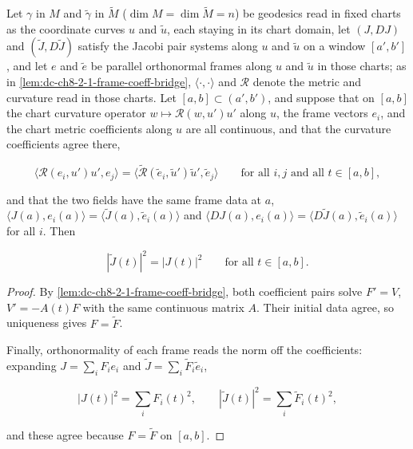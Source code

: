 \begin{lemma}
  \label{lem:dc-ch8-2-1-jacobi-norm-transfer-general}
  \leanok
  Let $\gamma$ in $M$ and $\tilde\gamma$ in $\tilde M$ ($\dim M=\dim\tilde M=n$) be geodesics
  read in fixed charts as the coordinate curves $u$ and $\tilde u$, each staying in its chart
  domain, let $(J,DJ)$ and $(\tilde J,D\tilde J)$ satisfy the Jacobi pair systems along $u$
  and $\tilde u$ on a window $[a',b']$, and let $e$ and $\tilde e$ be parallel orthonormal
  frames along $u$ and $\tilde u$ in those charts; as in
  \cref{lem:dc-ch8-2-1-frame-coeff-bridge}, $\langle\cdot,\cdot\rangle$ and $\mathcal R$
  denote the metric and curvature read in those charts. Let $[a,b]\subset(a',b')$, and
  suppose that on $[a,b]$ the chart curvature operator $w\mapsto\mathcal R(w,u')u'$ along
  $u$, the frame vectors $e_i$, and the chart metric coefficients along $u$ are all
  continuous, and that the curvature coefficients agree there,

  $$
  \langle\mathcal R(e_i,u')u',e_j\rangle
  =\big\langle\tilde{\mathcal R}(\tilde e_i,\tilde u')\tilde u',\tilde e_j\big\rangle
  \qquad\text{for all }i,j\text{ and all }t\in[a,b],
  $$

  and that the two fields have the same frame data at $a$,
  $\langle J(a),e_i(a)\rangle=\langle\tilde J(a),\tilde e_i(a)\rangle$ and
  $\langle DJ(a),e_i(a)\rangle=\langle D\tilde J(a),\tilde e_i(a)\rangle$ for all $i$.
  Then

  $$
  |\tilde J(t)|^2=|J(t)|^2\qquad\text{for all }t\in[a,b] .
  $$

\end{lemma}
\begin{proof}
  \leanok
\sketch
  By \cref{lem:dc-ch8-2-1-frame-coeff-bridge}, both coefficient pairs solve
  $F'=V$, $V'=-A(t)F$ with the same continuous matrix $A$. Their initial data agree,
  so uniqueness gives $F=\tilde F$.

  Finally, orthonormality of each frame reads the norm off the coefficients: expanding
  $J=\sum_i F_ie_i$ and $\tilde J=\sum_i\tilde F_i\tilde e_i$,

  $$
  |J(t)|^2=\sum_i F_i(t)^2,\qquad |\tilde J(t)|^2=\sum_i\tilde F_i(t)^2 ,
  $$

  and these agree because $F=\tilde F$ on $[a,b]$.
\end{proof}

